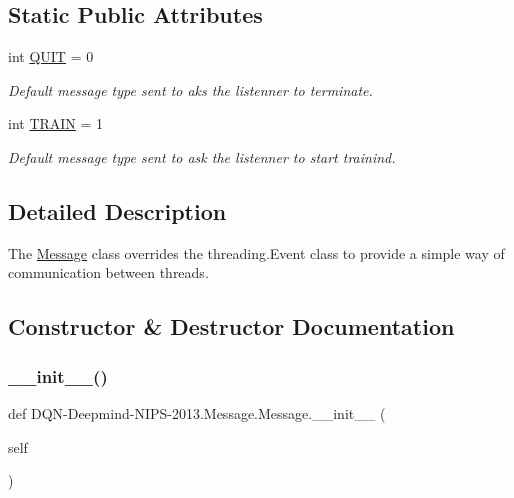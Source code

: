 \subsection*{Static Public Attributes}
\begin{DoxyCompactItemize}
\item 
int \hyperlink{classDQN-Deepmind-NIPS-2013_1_1Message_1_1Message_a87173863ddcb622f03cefa6dcf9cda53}{Q\+U\+IT} = 0
\begin{DoxyCompactList}\small\item\em Default message type sent to aks the listenner to terminate. \end{DoxyCompactList}\item 
int \hyperlink{classDQN-Deepmind-NIPS-2013_1_1Message_1_1Message_a440cc65343a167377dae7c508e571c79}{T\+R\+A\+IN} = 1
\begin{DoxyCompactList}\small\item\em Default message type sent to ask the listenner to start trainind. \end{DoxyCompactList}\end{DoxyCompactItemize}


\subsection{Detailed Description}
The \hyperlink{classDQN-Deepmind-NIPS-2013_1_1Message_1_1Message}{Message} class overrides the threading.\+Event class to provide a simple way of communication between threads. 

\subsection{Constructor \& Destructor Documentation}
\hypertarget{classDQN-Deepmind-NIPS-2013_1_1Message_1_1Message_a2fdcb857df94a7edc9b6e36ef0a8e1c6}{}\label{classDQN-Deepmind-NIPS-2013_1_1Message_1_1Message_a2fdcb857df94a7edc9b6e36ef0a8e1c6} 
\subsubsection{\texorpdfstring{\+\_\+\+\_\+init\+\_\+\+\_\+()}{\_\_init\_\_()}}
{\footnotesize\ttfamily def D\+QN-\/Deepmind-\/N\+I\+PS-\/2013.Message.\+Message.\+\_\+\+\_\+init\+\_\+\+\_\+ (\begin{DoxyParamCaption}\item[{}]{self }\end{DoxyParamCaption})}



